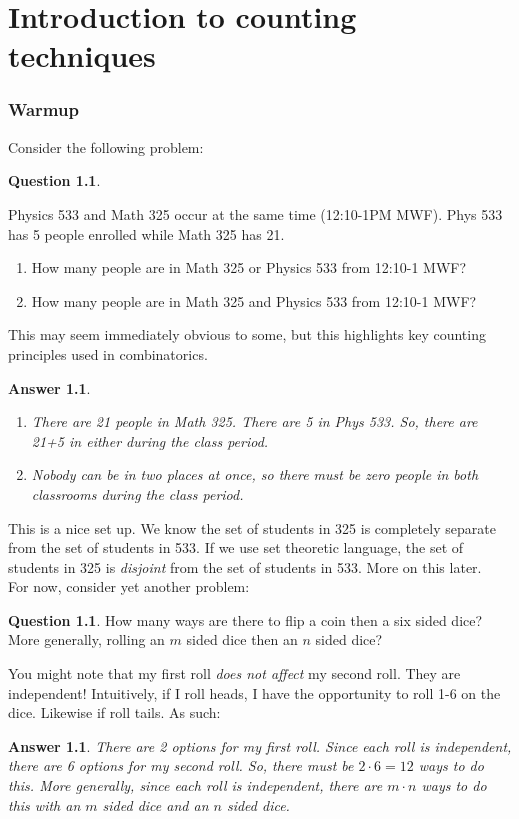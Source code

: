 \documentclass[openany]{book}
\newtheorem{answer}[thm]{Answer}
\theoremstyle{definition}
\newtheorem{question}[thm]{Question}
\begin{document}
\chapter{Introduction to counting techniques}

\subsection{Warmup}
Consider the following problem:
\begin{question}\label{question2}\hfill

    Physics 533 and Math 325 occur at the same time (12:10-1PM MWF). Phys 533 has 5 people enrolled while Math 325 has 21. 
    \begin{enumerate}
        \item How many people are in Math 325 or Physics 533 from 12:10-1 MWF? 
        \item How many people are in Math 325 and Physics 533 from 12:10-1 MWF? 
    \end{enumerate}
\end{question}
This may seem immediately obvious to some, but this highlights key counting principles used in combinatorics. 
\begin{answer}\hfill
    \begin{enumerate}
        \item There are 21 people in Math 325. There are 5 in Phys 533. So, there are 21+5 in either during the class period.
        \item Nobody can be in two places at once, so there must be zero people in both classrooms during the class period.
    \end{enumerate}
\end{answer}
This is a nice set up. We know the set of students in 325 is completely separate from the set of students in 533. If we use set theoretic language, the set of students in 325 is \emph{disjoint} from the set of students in 533. More on this later.\\
For now, consider yet another problem:
\begin{question}\hfill

    How many ways are there to flip a coin then a six sided dice? More generally, rolling an $m$ sided dice then an $n$ sided dice?
\end{question}
You might note that my first roll \emph{does not affect} my second roll. They are independent! Intuitively, if I roll heads, I have the opportunity to roll 1-6 on the dice. Likewise if roll tails. As such:
\begin{answer}\hfill

    There are 2 options for my first roll. Since each roll is independent, there are 6 options for my second roll. So, there must be $2\cdot 6=12$ ways to do this. More generally, since each roll is independent, there are $m\cdot n$ ways to do this with an $m$ sided dice and an $n$ sided dice.
\end{answer}
\end{document}
